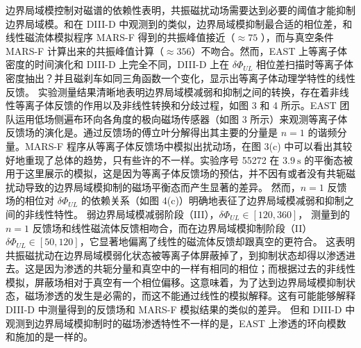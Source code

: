 边界局域模控制对磁谱的依赖性表明，共振磁扰动场需要达到必要的阈值才能抑制边界局域模。和在 DIII-D 中观测到的类似，边界局域模抑制最合适的相位差，和线性磁流体模拟程序 MARS-F 得到的共振峰值接近（$\approx 75$ \degree），而与真空条件 MARS-F 计算出来的共振峰值计算（$\approx 356$\degree）不吻合。然而，EAST 上等离子体密度的时间演化和 DIII-D 上完全不同，DIII-D 上在 $\delta\Phi_{UL}$ 相位差扫描时等离子体密度抽出？并且磁刹车如同三角函数一个变化，显示出等离子体动理学特性的线性反馈。
实验测量结果清晰地表明边界局域模减弱和抑制之间的转换，存在着非线性等离子体反馈的作用以及非线性转换和分歧过程，如图 3 和 4 所示。EAST 团队运用低场侧遍布环向各角度的极向磁场传感器（如图 3 所示）来观测等离子体反馈场的演化是。通过反馈场的傅立叶分解得出其主要的分量是 $n=1$ 的谐频分量。MARS-F 程序从等离子体反馈场中模拟出扰动场，在图 3(c) 中可以看出其较好地重现了总体的趋势，只有些许的不一样。实验序号 55272 在 $\SI{3.9}{\second}$ 的平衡态被用于这里展示的模拟，这是因为等离子体反馈场的预估，并不因有或者没有共轭磁扰动导致的边界局域模抑制的磁场平衡态而产生显著的差异。
然而，$n=1$ 反馈场的相位对 $\delta\Phi_{UL}$ 的依赖关系（如图 4(c)）明确地表征了边界局域模减弱和抑制之间的非线性特性。
弱边界局域模减弱阶段（III），$\delta\Phi_{UL}\in [120,360]$\degree， 测量到的 $n=1$ 反馈场和线性磁流体反馈相吻合，而在边界局域模抑制阶段（II）$\delta\Phi_{UL}\in [50,120]$\degree，它显著地偏离了线性的磁流体反馈却跟真空的更符合。
这表明共振磁扰动在边界局域模弱化状态被等离子体屏蔽掉了，到抑制状态却得以渗透进去。这是因为渗透的共轭分量和真空中的一样有相同的相位；而根据过去的非线性模拟，屏蔽场相对于真空有一个相位偏移。这意味着，为了达到边界局域模抑制状态，磁场渗透的发生是必需的，而这不能通过线性的模拟解释。这有可能能够解释 DIII-D 中测量得到的反馈场和 MARS-F 模拟结果的类似的差异。
但和 DIII-D 中观测到边界局域模抑制时的磁场渗透特性不一样的是，EAST 上渗透的环向模数和施加的是一样的。



